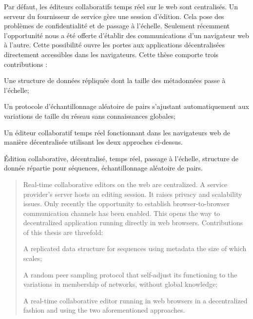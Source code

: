 
\begin{resume}
  Par défaut, les éditeurs collaboratifs temps réel sur le web sont
  centralisés. Un serveur du fournisseur de service gère une session
  d'édition. Cela pose des problèmes de confidentialité et de passage à
  l'échelle.  Seulement récemment l'opportunité nous a été offerte d'établir des
  communications d'un navigateur web à l'autre. Cette possibilité ouvre les
  portes aux applications décentralisées directement accessibles dans les
  navigateurs. Cette thèse comporte trois contributions :
  \begin{inparaenum}[(i)]
  \item Une structure de données répliquée dont la taille des métadonnées passe
    à l'échelle;
  \item Un protocole d'échantillonnage aléatoire de pairs s'ajustant
    automatiquement aux variations de taille du réseau sans connaissances
    globales;
  \item Un éditeur collaboratif temps réel fonctionnant dans les navigateurs web
    de manière décentralisée utilisant les deux approches ci-dessus.
  \end{inparaenum}
\end{resume}

\begin{motscles}
  Édition collaborative, décentralisé, temps réel, passage à l'échelle,
  structure de donnée répartie pour séquences, échantillonnage aléatoire de
  pairs.
\end{motscles}

\begin{abstract}
  Real-time collaborative editors on the web are centralized. A service
  provider's server hosts an editing session. It raises privacy and scalability
  issues. Only recently the opportunity to establish browser-to-browser
  communication channels has been enabled. This opens the way to decentralized
  application running directly in web browsers. Contributions of this thesis are
  threefold: 
  \begin{inparaenum}[(i)]
  \item A replicated data structure for sequences using metadata the size of
    which scales;
  \item A random peer sampling protocol that self-adjust its functioning to
    the variations in membership of networks, without global knowledge;
  \item A real-time collaborative editor running in web browsers in a
    decentralized fashion and using the two aforementioned approaches.
  \end{inparaenum}
\end{abstract}

